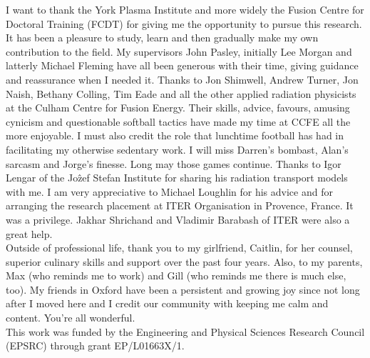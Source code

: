 
\begin{acknowledgements}      
I want to thank the York Plasma Institute and more widely the Fusion Centre for Doctoral Training (FCDT) for giving me the opportunity to pursue this research. It has been a pleasure to study, learn and then gradually make my own contribution to the field. My supervisors John Pasley, initially Lee Morgan and latterly Michael Fleming have all been generous with their time, giving guidance and reassurance when I needed it. Thanks to Jon Shimwell, Andrew Turner, Jon Naish, Bethany Colling, Tim Eade and all the other applied radiation physicists at the Culham Centre for Fusion Energy. Their skills, advice, favours, amusing cynicism and questionable softball tactics have made my time at CCFE all the more enjoyable. I must also credit the role that lunchtime football has had in facilitating my otherwise sedentary work. I will miss Darren's bombast, Alan's sarcasm and Jorge's finesse. Long may those games continue. Thanks to Igor Lengar of the Jo\^{z}ef Stefan Institute for sharing his radiation transport models with me. I am very appreciative to Michael Loughlin for his advice and for arranging the research placement at ITER Organisation in Provence, France. It was a privilege. Jakhar Shrichand and Vladimir Barabash of ITER were also a great help. 
\\
Outside of professional life, thank you to my girlfriend, Caitlin, for her counsel, superior culinary skills and support over the past four years. Also, to my parents, Max (who reminds me to work) and Gill (who reminds me there is much else, too). My friends in Oxford have been a persistent and growing joy since not long after I moved here and I credit our community with keeping me calm and content. You're all wonderful.
\\
This work was funded by the Engineering and Physical Sciences Research Council (EPSRC) through grant EP/L01663X/1.
\end{acknowledgements}
